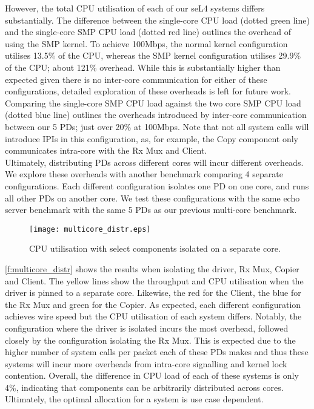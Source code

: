 However, the total CPU utilisation of each of our seL4 systems differs substantially. 
The difference between the single-core CPU load (dotted green line) and the single-core SMP CPU load (dotted red line) 
outlines the overhead of using the SMP kernel. To achieve 100Mbps, the normal kernel configuration utilises 13.5\% of the CPU, whereas
the SMP kernel configuration utilises 29.9\% of the CPU; about 121\% overhead. While this is substantially higher than expected given
there is no inter-core communication for either of these configurations, detailed
exploration of these overheads is left for future work. 
Comparing the single-core SMP CPU load against the two core SMP CPU load (dotted blue line) outlines the overheads introduced by
inter-core communication between our 5 PDs; just over 20\% at 100Mbps. Note that not all system calls will introduce IPIs in
this configuration, as, for example, the Copy component only communicates intra-core with the Rx Mux and Client. \\

Ultimately, distributing PDs across different cores will incur different overheads. We explore these overheads with another benchmark
comparing 4 separate configurations. Each different configuration isolates one PD on one core, and runs all other PDs on another core. 
We test these configurations with the same echo server benchmark with the same 5 PDs as our previous multi-core benchmark.

\begin{figure}[H]
    \centering
    \texttt{[image: multicore\_distr.eps]}
    \caption{CPU utilisation with select components isolated on a separate core.}
    \label{f:multicore_distr}
\end{figure}

\autoref{f:multicore_distr} shows the results when isolating the driver, Rx Mux, Copier and Client. The yellow lines show the throughput
and CPU utilisation when the driver is pinned to a separate core. 
Likewise, the red for the Client, the blue for the Rx Mux and green for
the Copier. As expected, each different configuration achieves wire speed but the CPU utilisation of each system differs. Notably, 
the configuration where the driver is isolated incurs the most overhead, followed closely by the configuration isolating the Rx Mux. This is 
expected due to the higher number of system calls per packet each of these PDs makes and thus these systems will incur more overheads from
intra-core signalling and kernel lock contention. Overall, the difference in CPU load of each of these systems is only 4\%, indicating that
components can be arbitrarily distributed across cores. Ultimately, the optimal allocation for a system is use case dependent.\\

